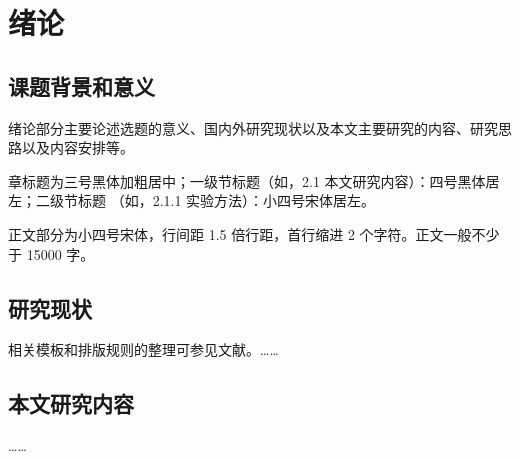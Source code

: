 \chapter{绪论}

\section{课题背景和意义}

绪论部分主要论述选题的意义、国内外研究现状以及本文主要研究的内容、研究思路以及内容安排等。

章标题为三号黑体加粗居中；一级节标题（如，2.1 本文研究内容）：四号黑体居左；二级节标题
（如，2.1.1 实验方法）：小四号宋体居左。

正文部分为小四号宋体，行间距 1.5 倍行距，首行缩进 2 个字符。正文一般不少于 15000 字。

\section{研究现状}

相关模板和排版规则的整理可参见文献\cite{baker1995,desmarais1992}。……

\section{本文研究内容}

……
